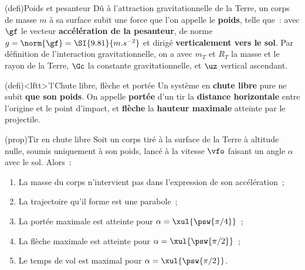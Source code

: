 \documentclass[../../main/main.tex]{subfiles}
\begin{document}
\begin{tcb*}[sidebyside](defi){Poids et pesanteur}
	Dû à l'attraction gravitationnelle de la Terre, un corps de masse $m$ à sa
	surface subit une force que l'on appelle le \textbf{poids}, telle que~:
	\psw{%
		\[\boxed{\Pf = m\gf = -mg\uz}\]
	}%
	avec $\gf$ le vecteur \textbf{accélération de la pesanteur}, de norme $g =
		\norm{\gf} = \SI{9.81}{m.s^{-2}}$ et dirigé \textbf{verticalement vers le
		sol}.
	\tcblower
	Par définition de l'interaction gravitationnelle, on a
	\psw{%
	\[\boxed{\gf = -\Gc \frac{m_T}{R_T{}^2}\uz}\]
	}%
	avec $m_T$ et $R_T$ la masse et le rayon de la Terre, $\Gc$ la constante
	gravitationnelle, et $\uz$ vertical ascendant.
\end{tcb*}

\begin{tcb*}(defi)<lftt>'l'{Chute libre, flèche et portée}
	Un système en \textbf{chute libre} pure ne subit \textbf{que son poids}. On
	appelle \textbf{portée} d'un tir la \textbf{distance horizontale} entre
	l'origine et le point d'impact, et \textbf{flèche} la \textbf{hauteur
		maximale} atteinte par le projectile.
\end{tcb*}

\begin{tcb*}(prop){Tir en chute libre}
	Soit un corps tiré à la surface de la Terre à altitude nulle, soumis
	uniquement à son poids, lancé à la vitesse $\vfo$ faisant un angle $\alpha$
	avec le sol. Alors~:
	\begin{enumerate}
		\item La masse du corps n'intervient pas dans l'expression de son
		      accélération~;
		\item La trajectoire qu'il forme est une parabole~;
		\item La portée maximale est atteinte pour $\alpha = \xul{\psw{\pi/4}}$~;
		\item La flèche maximale est atteinte pour $\alpha = \xul{\psw{\pi/2}}$~;
		\item Le temps de vol est maximal pour $\alpha = \xul{\psw{\pi/2}}$.
	\end{enumerate}
\end{tcb*}
\end{document}

